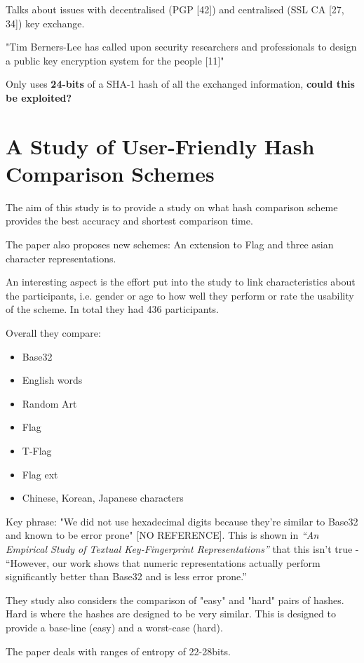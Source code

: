 Talks about issues with decentralised (PGP [42]) and centralised (SSL CA [27, 34]) key exchange.

"Tim Berners-Lee has called upon security researchers and professionals to design a public key encryption system for the people [11]"

Only uses \textbf{24-bits} of a SHA-1 hash of all the exchanged information, \textbf{could this be exploited?}

\newpage
\section{A Study of User-Friendly Hash Comparison Schemes}

The aim of this study is to provide a study on what hash comparison scheme provides the best accuracy and shortest comparison time.

The paper also proposes new schemes: An extension to Flag and three asian character representations. 

An interesting aspect is the effort put into the study to link characteristics about the participants, i.e. gender or age to how well they perform or rate the usability of the scheme. In total they had 436 participants.

Overall they compare:
\begin{itemize}
    \item Base32
    \item English words
    \item Random Art
    \item Flag
    \item T-Flag
    \item Flag ext
    \item Chinese, Korean, Japanese characters
\end{itemize}

Key phrase: "We did not use hexadecimal digits because they're similar to Base32 and known to be error prone" [NO REFERENCE]. This is shown in \textit{``An Empirical Study of Textual Key-Fingerprint Representations''} that this isn't true - ``However, our work shows that numeric representations actually perform significantly better than Base32 and is less error prone.''

They study also considers the comparison of "easy" and "hard" pairs of hashes. Hard is where the hashes are designed to be very similar. This is designed to provide a base-line (easy) and a worst-case (hard).

The paper deals with ranges of entropy of 22-28bits.

